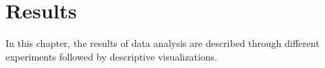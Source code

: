 \section{Results}
\label{sec:results}

In this chapter, the results of data analysis are described through different experiments followed by descriptive visualizations.





